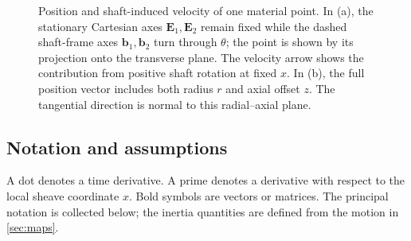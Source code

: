 \documentclass[11pt,letterpaper]{article}
\numberwithin{equation}{section}
\begin{document}
\begin{figure}[!ht]
\caption{Position and shaft-induced velocity of one material point. In (a), the stationary Cartesian axes $\bm E_1,\bm E_2$ remain fixed while the dashed shaft-frame axes $\bm b_1,\bm b_2$ turn through $\theta$; the point is shown by its projection onto the transverse plane. The velocity arrow shows the contribution from positive shaft rotation at fixed $x$. In (b), the full position vector includes both radius $r$ and axial offset $z$. The tangential direction is normal to this radial--axial plane.}
\label{fig:coordinates}
\end{figure}

\FloatBarrier
\subsection{Notation and assumptions}

A dot denotes a time derivative. A prime denotes a derivative with respect to the local sheave coordinate $x$. Bold symbols are vectors or matrices. The principal notation is collected below; the inertia quantities are defined from the motion in \cref{sec:maps}.
\end{document}
